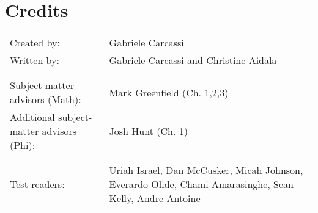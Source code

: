 \documentclass[11pt,letterpaper,fleqn]{memoir} %
\begin{document}
\chapter[Credits]{\centering Credits}

\begin{table}[h]
\centering
\begin{tabular}{R{0.45\textwidth} L{0.5\textwidth}}
Created by: & Gabriele Carcassi \\
Written by: & Gabriele Carcassi and Christine Aidala \\
& \\
& \\
Subject-matter advisors (Math): & Mark Greenfield (Ch. 1,2,3) \\
Additional subject-matter advisors (Phi): & Josh Hunt (Ch. 1) \\
& \\
& \\
Test readers: & Uriah Israel, Dan McCusker, Micah Johnson, Everardo Olide, Chami Amarasinghe, Sean Kelly, Andre Antoine \\




\end{tabular} 
\end{table}


	
\end{document}
